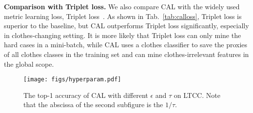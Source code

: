 \documentclass[10pt,twocolumn,letterpaper]{article}
\begin{document}
\medskip
\noindent
\textbf{Comparison with Triplet loss.}
We also compare CAL with the widely used metric learning loss, \ie Triplet loss~\cite{Hermans2017In}.
As shown in Tab.~\ref{tab:calloss}, Triplet loss is superior to the baseline, but CAL outperforms Triplet loss significantly, especially in clothes-changing setting.
It is more likely that Triplet loss can only mine the hard cases in a mini-batch, while CAL uses a clothes classifier to save the proxies of all clothes classes in the training set and can mine clothes-irrelevant features in the global scope.



\begin{table}[t]
	\centering
	\caption{Comparison on standard datasets without clothes-changing.}
	\vspace{-20pt}
	\small
	\begin{center}
	\end{center}
	\vspace{-15pt}
	\label{tab:standard_dataset}
\end{table}

\begin{figure} [t]
	\centering
	\texttt{[image: figs/hyperparam.pdf]}
	\vspace{-15pt}
	\caption{The top-1 accuracy of CAL with different $\epsilon$ and $\tau$ on LTCC. Note that the abscissa of the second subfigure is the $1/\tau$.}
	\label{fig:hyperparam} 
	\vspace{-15pt}
\end{figure}
\end{document}
